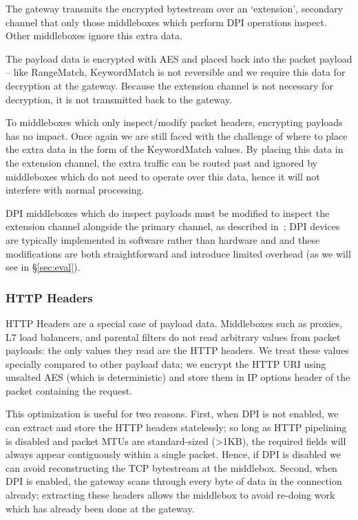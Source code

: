 The gateway transmits the encrypted bytestream over an `extension', secondary channel that only those middleboxes which perform DPI operations inspect. 
Other middleboxes ignore this extra data.



 The payload data is encrypted with AES and placed back into the packet payload -- like RangeMatch, KeywordMatch is not reversible and we require this data for decryption at the gateway.
Because the extension channel is not necessary for decryption, it is not transmitted back to the gateway.

 To middleboxes which only inspect/modify packet headers, encrypting payloads has no impact. Once again we are still faced with the challenge of where to place the extra data in the form of the KeywordMatch values. By placing this data in the extension channel, the extra traffic can be routed past and ignored by middleboxes which do not need to operate over this data, hence it will not interfere with normal processing. 

DPI middleboxes which do inspect payloads must be modified to inspect the extension channel alongside the primary channel, as described in~\cite{blindbox}; DPI devices are typically implemented in software rather than hardware and and these modifications are both straightforward and introduce limited overhead (as we will see in \S\ref{sec:eval}). 

\subsubsection{HTTP Headers} 

HTTP Headers are a special case of payload data.
Middleboxes such as proxies, L7 load balancers, and parental filters do not read arbitrary values from packet payloads: the only values they read are the HTTP headers.
We treat these values specially compared to other payload data; we encrypt the HTTP URI using unsalted AES (which is deterministic) and store them in IP options header of the packet containing the request.

This optimization is useful for two reasons. 
First, when DPI is not enabled, we can extract and store the HTTP headers statelessly; so long as HTTP pipelining is disabled and packet MTUs are standard-sized (>1KB), the required fields will always appear contiguously within a single packet.
Hence, if DPI is disabled we can avoid reconstructing the TCP bytestream at the middlebox.
Second, when DPI is enabled, the gateway scans through every byte of data in the connection already;  extracting these headers allows the middlebox to avoid re-doing work which has already been done at the gateway.

